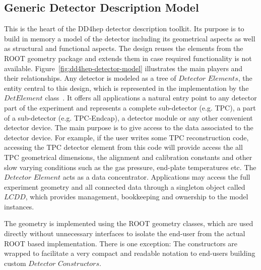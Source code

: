 \subsection{Generic Detector Description Model}
\label{subsec:generic-model}

\noindent
This is the heart of the DD4hep detector description toolkit. Its purpose is 
to build in memory a model of the detector including its geometrical aspects
as well as structural and functional aspects. The design reuses the elements 
from the ROOT geometry package and extends them in case required functionality 
is not available. Figure~\ref{fig:dd4hep-detector-model} illustrates the main
players and their relationships.
Any detector is modeled as a tree of $Detector$ $Elements$, the entity 
central to this design, which is represented in the implementation by 
the $DetElement$ class~\cite{bib:LHCb-geometry}. It offers all
applications a natural entry point to any detector part of the experiment
and represents a complete sub-detector (e.g. TPC), a part of a 
sub-detector (e.g. TPC-Endcap), a detector module or any other convenient 
detector device. 
The main purpose is to give access to the data associated 
to the detector device. For example, if the user writes some TPC reconstruction 
code, accessing the TPC detector element from this code will provide access 
the all TPC geometrical dimensions, the alignment and calibration constants 
and other slow varying conditions such as the gas pressure, end-plate 
temperatures etc. The $Detector$ $Element$ acts as a data concentrator. 
Applications may access the full experiment geometry and all connected data
through a singleton object called $LCDD$, which provides 
management, bookkeeping and ownership to the model instances.

\noindent
The geometry is implemented using the ROOT geometry classes, which are used
directly without unnecessary interfaces to isolate the end-user from the 
actual ROOT based implementation. There is one exception: 
The constructors are wrapped to facilitate a very compact and readable 
notation to end-users building custom $Detector$ $Constructors$.

